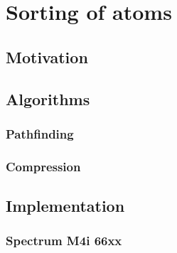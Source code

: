 \chapter{Sorting of atoms}
	\section{Motivation}
	\section{Algorithms}
		\subsection{Pathfinding}
		\subsection{Compression}
	\section{Implementation}
		\subsection{Spectrum M4i 66xx}

